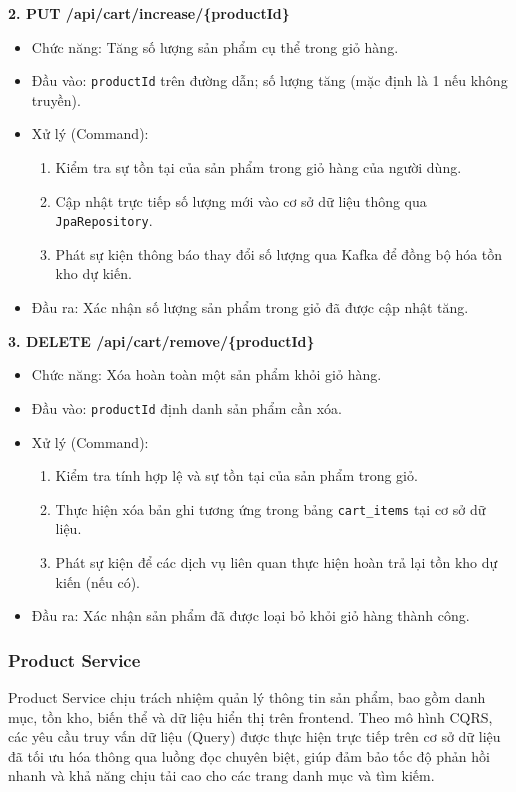 \textbf{2. PUT /api/cart/increase/\{productId\}}
\begin{itemize}
    \item Chức năng: Tăng số lượng sản phẩm cụ thể trong giỏ hàng.
    \item Đầu vào: \texttt{productId} trên đường dẫn; số lượng tăng (mặc định là 1 nếu không truyền).
    \item Xử lý (Command):
    \begin{enumerate}
        \item Kiểm tra sự tồn tại của sản phẩm trong giỏ hàng của người dùng.
        \item Cập nhật trực tiếp số lượng mới vào cơ sở dữ liệu thông qua \texttt{JpaRepository}.
        \item Phát sự kiện thông báo thay đổi số lượng qua Kafka để đồng bộ hóa tồn kho dự kiến.
    \end{enumerate}
    \item Đầu ra: Xác nhận số lượng sản phẩm trong giỏ đã được cập nhật tăng.
\end{itemize}

\textbf{3. DELETE /api/cart/remove/\{productId\}}
\begin{itemize}
    \item Chức năng: Xóa hoàn toàn một sản phẩm khỏi giỏ hàng.
    \item Đầu vào: \texttt{productId} định danh sản phẩm cần xóa.
    \item Xử lý (Command):
    \begin{enumerate}
        \item Kiểm tra tính hợp lệ và sự tồn tại của sản phẩm trong giỏ.
        \item Thực hiện xóa bản ghi tương ứng trong bảng \texttt{cart\_items} tại cơ sở dữ liệu.
        \item Phát sự kiện để các dịch vụ liên quan thực hiện hoàn trả lại tồn kho dự kiến (nếu có).
    \end{enumerate}
    \item Đầu ra: Xác nhận sản phẩm đã được loại bỏ khỏi giỏ hàng thành công.
\end{itemize}

\subsubsection{Product Service}

Product Service chịu trách nhiệm quản lý thông tin sản phẩm, bao gồm danh mục, tồn kho, biến thể và dữ liệu hiển thị trên frontend. Theo mô hình CQRS, các yêu cầu truy vấn dữ liệu (Query) được thực hiện trực tiếp trên cơ sở dữ liệu đã tối ưu hóa thông qua luồng đọc chuyên biệt, giúp đảm bảo tốc độ phản hồi nhanh và khả năng chịu tải cao cho các trang danh mục và tìm kiếm.

